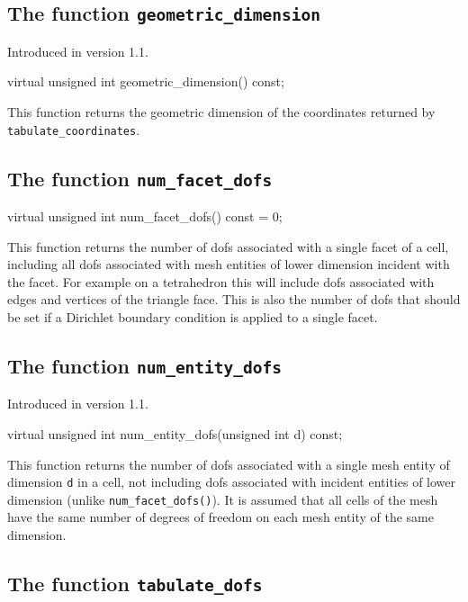 \subsection{The function \texttt{geometric\_dimension}}
Introduced in version 1.1.

\begin{code}
virtual unsigned int geometric_dimension() const;
\end{code}

This function returns the geometric dimension of the coordinates
returned by \texttt{tabulate\_coordinates}.

\subsection{The function \texttt{num\_facet\_dofs}}

\begin{code}
virtual unsigned int num_facet_dofs() const = 0;
\end{code}

This function returns the number of dofs associated with a single facet
of a cell, including all dofs associated with mesh entities of lower
dimension incident with the facet. For example on a tetrahedron this
will include dofs associated with edges and vertices of the triangle face.
This is also the number of dofs that should be set if a Dirichlet
boundary condition is applied to a single facet.

\subsection{The function \texttt{num\_entity\_dofs}}
Introduced in version 1.1.

\begin{code}
virtual unsigned int num_entity_dofs(unsigned int d) const;
\end{code}

This function returns the number of dofs associated with a single
mesh entity of dimension \texttt{d} in a cell, not including
dofs associated with incident entities of lower dimension
(unlike \texttt{num\_facet\_dofs()}).
It is assumed that all cells of the mesh have the same number
of degrees of freedom on each mesh entity of the same dimension.

\subsection{The function \texttt{tabulate\_dofs}}

